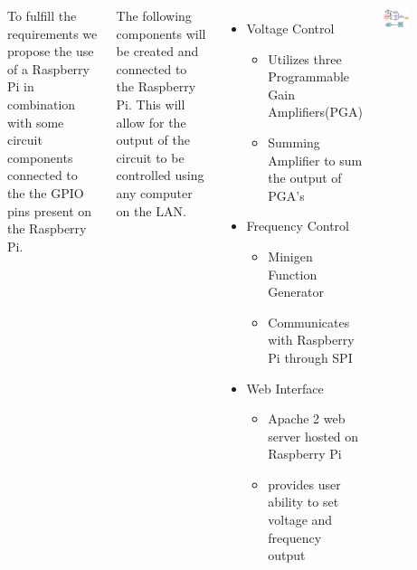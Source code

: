 \documentclass[25pt, a0paper, portrait, margin=0mm, innermargin=15mm, blockverticalspace=15mm, colspace=15mm, subcolspace=8mm]{tikzposter}
\begin{document}
\begin{columns}

{
To fulfill the requirements we propose the use of 
a Raspberry Pi in combination with 
some circuit components connected to the the GPIO pins
present on the Raspberry Pi.


The following components will be created and connected to the Raspberry Pi.
This will allow for the output of the circuit to be controlled using any computer on the LAN.
\begin{itemize}
\item Voltage Control
  \begin{itemize}
  \item Utilizes three Programmable Gain Amplifiers(PGA)
  \item Summing Amplifier to sum the output of PGA's
  \end{itemize}
\item Frequency Control
  \begin{itemize}
  \item Minigen Function Generator
  \item Communicates with Raspberry Pi through SPI
  \end{itemize}
\item Web Interface
  \begin{itemize}
  \item Apache 2 web server hosted on Raspberry Pi
  \item provides user ability to set voltage and frequency output
  \end{itemize}
\end{itemize}
}


%
%
{
\begin{center}
\includegraphics[width=0.35\textwidth,keepaspectratio]{block_diagram.png}
\end{center}

}


\end{columns}
\end{document}
